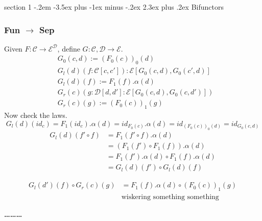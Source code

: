 \documentclass[12pt]{article}
\makeatletter
\theoremstyle{definition}
\newenvironment{problem}{\@startsection
       {section}
       {1}
       {-.2em}
       {-3.5ex plus -1ex minus -.2ex}
       {2.3ex plus .2ex}
       {\pagebreak[3]%
       \large\bf\noindent{Problem }
       }
       }
       {%
       \begin{center}\large\bf \ldots\ldots\ldots\end{center}}
\newcommand{\cat}{\mathcal}
\makeatother
\begin{document}
\begin{problem}{Bifunctors}
\subsubsection*{Fun $\to$ Sep}
Given $F :\cat C \to \cat E^{\cat D} $, define $G :\cat C , \cat D \to \cat E $.
\begin{align*}
    &G_0(c,d) := (F_0(c))_0(d)\\
    &G_l(d)(f: \cat C[c,c']) : \cat E[G_0(c,d),G_0(c',d)]\\
    &G_l(d)(f)  := F_1(f).\alpha(d)\\
    &G_r(c)(g : \cat D[d,d'] : \cat E[G_0(c,d),G_0(c,d')])\\
    &G_r(c)(g) := (F_0(c))_1(g)
\end{align*}
Now check the laws.\\
\[
    G_l(d)(id_c) = F_1(id_c).\alpha(d)= id_{F_0(c)}.\alpha(d) = id_{(F_0(c))_0(d)} = id_{G_0(c,d)}
\]
\begin{align*} 
    G_l(d)(f' \circ f) &= F_1(f' \circ f).\alpha(d) \\
    &= (F_1(f') \circ F_1(f)).\alpha(d)\\
    &= F_1(f').\alpha(d) \circ F_1(f).\alpha(d)\\
    &= G_l(d)(f') \circ G_l(d)(f)
\end{align*}

\begin{align*} 
    G_l(d')(f) \circ G_r(c)(g) &= F_1(f).\alpha(d) \circ (F_0(c))_1(g)\\
    &\text{wiskering something something}
\end{align*}

\end{problem}
\end{document}
